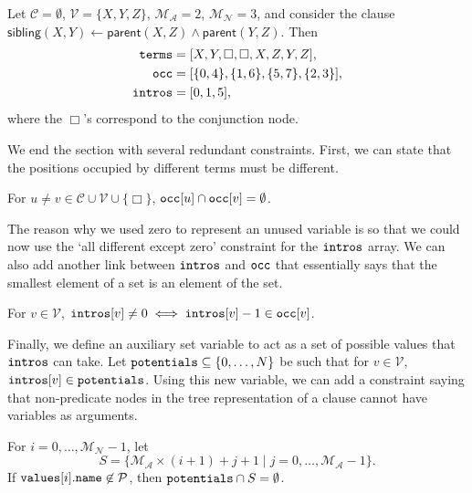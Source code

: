 \documentclass[runningheads]{llncs}
\newcommand{\variable}[1]{\texttt{\textup{#1}}}
\newcommand{\predicates}{\mathcal{P}}
\newcommand{\variables}{\mathcal{V}}
\newcommand{\constants}{\mathcal{C}}
\newcommand{\maxArity}{\mathcal{M}_{\mathcal{A}}}
\newcommand{\maxNumNodes}{\mathcal{M}_{\mathcal{N}}}
\begin{document}
\begin{example} \label{example:sibling}
  Let $\constants{} = \emptyset$, $\variables{} = \{ X, Y, Z \}$, $\maxArity{} =
  2$, $\maxNumNodes{} = 3$, and consider the clause $\mathsf{sibling}(X, Y)
  \gets \mathsf{parent}(X, Z) \land \mathsf{parent}(Y, Z)$. Then
  \begin{align*}
    \variable{terms} &= [X, Y, \Box, \Box, X, Z, Y, Z], \\
    \variable{occ} &= [\{ 0, 4 \}, \{ 1, 6 \}, \{ 5, 7 \}, \{ 2, 3 \}], \\
    \variable{intros} &= [0, 1, 5],
  \end{align*}
  where the $\Box$'s correspond to the conjunction node.
\end{example}

We end the section with several redundant constraints. First, we can state that
the positions occupied by different terms must be different.
\begin{constraint} \label{constraint:all_diff}
  For $u \ne v \in \constants{} \cup \variables{} \cup \{ \Box \}$,
  $\variable{occ}[u] \cap \variable{occ}[v] = \emptyset$.
\end{constraint}
The reason why we used zero to represent an unused variable is so that we could
now use the `all different except zero' constraint for the $\variable{intros}$
array. We can also add another link between $\variable{intros}$ and
$\variable{occ}$ that essentially says that the smallest element of a set is an
element of the set.
\begin{constraint}
  For $v \in \variables{}$, $\variable{intros}[v] \ne 0 \iff
  \variable{intros}[v] - 1 \in \variable{occ}[v]$.
\end{constraint}
Finally, we define an auxiliary set variable to act as a set of possible values
that $\variable{intros}$ can take. Let $\variable{potentials} \subseteq \{ 0,
\dots, N \}$ be such that for $v \in \variables{}$, $\variable{intros}[v] \in
\variable{potentials}$. Using this new variable, we can add a constraint saying
that non-predicate nodes in the tree representation of a clause cannot have
variables as arguments.
\begin{constraint} \label{constraint:potentialIntroductions}
  For $i = 0, \dots, \maxNumNodes{} - 1$, let
  \[
    S = \{ \maxArity{} \times (i + 1) + j + 1 \mid j = 0, \dots, \maxArity{} - 1
    \}.
  \]
  If $\variable{values}[i].\variable{name} \not\in \predicates{}$, then
  $\variable{potentials} \cap S = \emptyset$.
\end{constraint}
\end{document}
